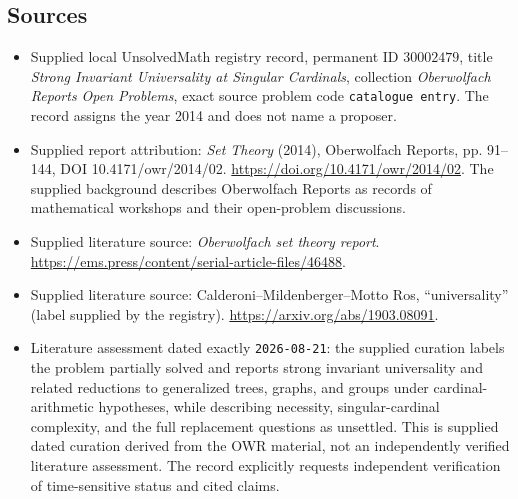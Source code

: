 \documentclass[11pt]{article}
\begin{document}
\subsection{Sources}
\begin{itemize}
\item Supplied local UnsolvedMath registry record, permanent ID \(30002479\), title \emph{Strong Invariant Universality at Singular Cardinals}, collection \emph{Oberwolfach Reports Open Problems}, exact source problem code \texttt{catalogue entry}. The record assigns the year 2014 and does not name a proposer.
\item Supplied report attribution: \emph{Set Theory} (2014), Oberwolfach Reports, pp. 91--144, DOI 10.4171/owr/2014/02. \url{https://doi.org/10.4171/owr/2014/02}. The supplied background describes Oberwolfach Reports as records of mathematical workshops and their open-problem discussions.
\item Supplied literature source: \emph{Oberwolfach set theory report}. \url{https://ems.press/content/serial-article-files/46488}.
\item Supplied literature source: Calderoni--Mildenberger--Motto Ros, ``universality'' (label supplied by the registry). \url{https://arxiv.org/abs/1903.08091}.
\item Literature assessment dated exactly \texttt{2026-08-21}: the supplied curation labels the problem partially solved and reports strong invariant universality and related reductions to generalized trees, graphs, and groups under cardinal-arithmetic hypotheses, while describing necessity, singular-cardinal complexity, and the full replacement questions as unsettled. This is supplied dated curation derived from the OWR material, not an independently verified literature assessment. The record explicitly requests independent verification of time-sensitive status and cited claims.
\end{itemize}
\end{document}
